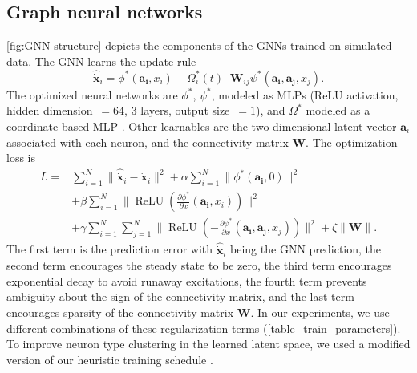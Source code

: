 \documentclass[10pt,twocolumn]{article}
\DeclareMathOperator*{\Agg}{\sum_{j=1}^{N}}
\DeclareMathOperator*{\relu}{ReLU}
\newcommand{\loss}{L}
\renewcommand\Vec[1]{\ensuremath{\boldsymbol{#1}}}
\newcommand\Mat[1]{\ensuremath{\boldsymbol{#1}}}
\begin{document}
\subsection{Graph neural networks}

\cref{fig:GNN structure} depicts the components of the GNNs trained on simulated data. The GNN learns the update rule
\begin{equation}
\widehat{\dot{\Vec{x}}}_{i} =\phi^*\left(\Vec{a_i}, x_i\right) + \Omega_i^*\left(t\right) \Agg \Mat{W}_{ij}\psi^*\left(\Vec{a_i},\Vec{a_j},x_j\right).
\label{eqn:GNN}
\end{equation}
The optimized neural networks are $\phi^*$, $\psi^*$, modeled as MLPs (ReLU activation, hidden dimension~$=64$, 3 layers, output size~$= 1$), and $\Omega^*$ modeled as a coordinate-based MLP \citep[][, input size~$= 3$,  hidden dimension~$=128$, 5 layers, output size~$= 1$, $\omega=0.3$]{sitzmann_implicit_2020}. Other learnables are the two-dimensional latent vector $\Vec{a}_i$ associated with each neuron, and the connectivity matrix $\Mat{W}$. The optimization loss is
\begin{equation*}
\begin{split}
\loss = {} & \sum_{i = 1}^N \lVert \widehat{\dot{\Vec{x}}}_{i} - \dot{\Vec{x}}_{i}\rVert^2 + \alpha\sum_{i = 1}^N \lVert\phi^*\left(\Vec{a_i}, 0\right)\rVert^2 \\
& + \beta\sum_{i = 1}^N \lVert \relu\left(\frac{\partial\phi^*}{\partial x}\left(\Vec{a_i}, x_i\right)\right)\rVert^2 \\
& + \gamma\sum_{i = 1}^N\sum_{j = 1}^N \lVert \relu\left(-\frac{\partial\psi^*}{\partial x}\left(\Vec{a_i}, \Vec{a_j}, x_j\right)\right)\rVert^2  + \zeta\lVert \Mat{W} \rVert.
\end{split}
\label{eqn:loss_prediction}
\end{equation*}
The first term is the prediction error with $\widehat{\dot{\Vec{x}}}_{i}$ being the GNN prediction, the second term encourages the steady state to be zero, the third term encourages exponential decay to avoid runaway excitations, the fourth term prevents ambiguity about the sign of the connectivity matrix, and the last term encourages sparsity of the connectivity matrix $\Mat{W}$.  In our experiments, we use different combinations of these regularization terms (\cref{table_train_parameters}).  To improve neuron type clustering in the learned latent space, we used a modified version of our heuristic training schedule \citep[][; details in \cref{appendix:cluster-training}]{allier_decomposing_2024}.
\end{document}
